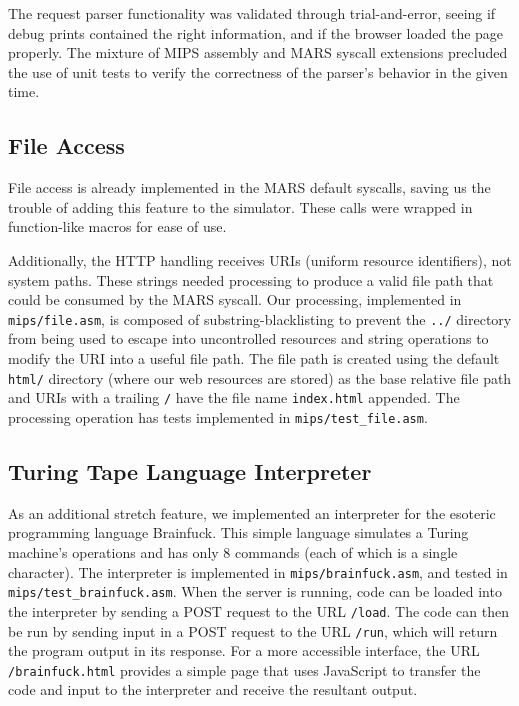 \documentclass[journal,10pt]{IEEEtran}
\begin{document}
The request parser functionality was validated through trial-and-error, seeing
if debug prints contained the right information, and if the browser loaded the
page properly. The mixture of MIPS assembly and MARS syscall extensions
precluded the use of unit tests to verify the correctness of the parser's
behavior in the given time.

\subsection{File Access}

File access is already implemented in the MARS default syscalls, saving us the
trouble of adding this feature to the simulator. These calls were wrapped in
function-like macros for ease of use.

Additionally, the HTTP handling receives URIs (uniform resource identifiers),
not system paths. These strings needed processing to produce a valid file path
that could be consumed by the MARS syscall. Our processing, implemented in
\texttt{mips/file.asm}, is composed of substring-blacklisting to prevent the
\texttt{../} directory from being used to escape into uncontrolled resources and
string operations to modify the URI into a useful file path. The file path is
created using the default \texttt{html/} directory (where our web resources are
stored) as the base relative file path and URIs with a trailing \texttt{/} have
the file name \texttt{index.html} appended. The processing operation has tests
implemented in \texttt{mips/test\_file.asm}.

\subsection{Turing Tape Language Interpreter}

As an additional stretch feature, we implemented an interpreter for the
esoteric programming language Brainfuck\cite{Mpreu/preller}.  This simple
language simulates a Turing machine's operations and has only 8 commands (each
of which is a single character).  The interpreter is implemented in
\texttt{mips/brainfuck.asm}, and tested in \texttt{mips/test\_brainfuck.asm}.
When the server is running, code can be loaded into the interpreter by sending a
POST request to the URL \texttt{/load}.  The code can then be run by sending
input in a POST request to the URL \texttt{/run}, which will return the program
output in its response.  For a more accessible interface, the URL
\texttt{/brainfuck.html} provides a simple page that uses JavaScript to transfer
the code and input to the interpreter and receive the resultant output.
\end{document}
